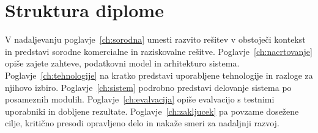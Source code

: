 \section{Struktura diplome}
\label{sec:pregled-vsebine}

V nadaljevanju poglavje~\ref{ch:sorodna} umesti razvito rešitev v obstoječi kontekst in predstavi sorodne komercialne in raziskovalne rešitve. Poglavje~\ref{ch:nacrtovanje} opiše zajete zahteve, podatkovni model in arhitekturo sistema. Poglavje~\ref{ch:tehnologije} na kratko predstavi uporabljene tehnologije in razloge za njihovo izbiro. Poglavje~\ref{ch:sistem} podrobno predstavi delovanje sistema po posameznih modulih. Poglavje~\ref{ch:evalvacija} opiše evalvacijo s testnimi uporabniki in dobljene rezultate. Poglavje~\ref{ch:zakljucek} pa povzame dosežene cilje, kritično presodi opravljeno delo in nakaže smeri za nadaljnji razvoj.
